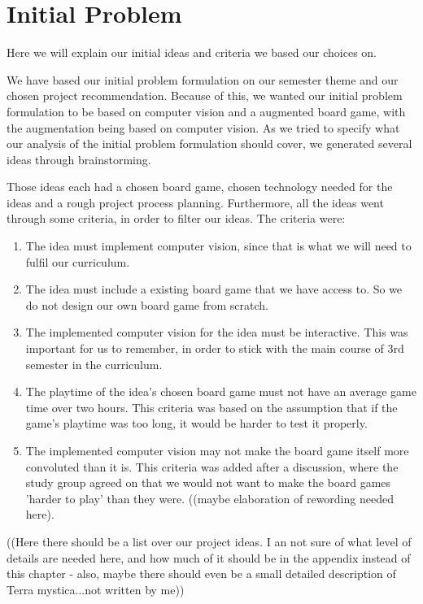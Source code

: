 \chapter{Initial Problem}\label{ch:iniprob}
Here we will explain our initial ideas and criteria we based our choices on.

We have based our initial problem formulation on our semester theme and our chosen project recommendation. Because of this, we wanted our initial problem formulation to be based on computer vision and a augmented board game, with the augmentation being based on computer vision. As we tried to specify what our analysis of the initial problem formulation should cover, we generated several ideas through brainstorming.

Those ideas each had a chosen board game, chosen technology needed for the ideas and a rough project process planning. Furthermore, all the ideas went through some criteria, in order to filter our ideas.
The criteria were:
\begin{enumerate}
	\item The idea must implement computer vision, since that is what we will need to fulfil our curriculum.
	\item The idea must include a existing board game that we have access to. So we do not design our own board game from scratch.
	\item The implemented computer vision for the idea must be interactive. This was important for us to remember, in order to stick with the main course of 3rd semester in the curriculum.
	\item The playtime of the idea's chosen board game must not have an average game time over two hours. This criteria was based on the assumption that if the game's playtime was too long, it would be harder to test it properly.
	\item The implemented computer vision may not make the board game itself more convoluted than it is. This criteria was added after a discussion, where the study group agreed on that we would not want to make the board games 'harder to play' than they were. ((maybe elaboration of rewording needed here).
\end{enumerate}

((Here there should be a list over our project ideas. I an not sure of what level of details are needed here, and how much of it should be in the appendix instead of this chapter - also, maybe there should even be a small detailed description of Terra mystica...not written by me))

